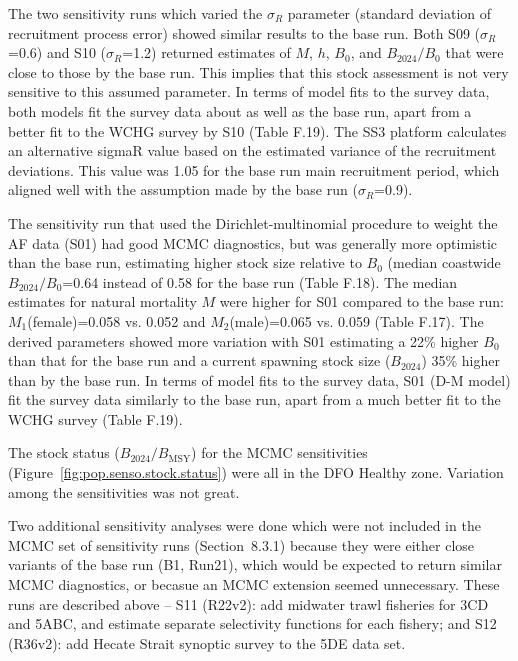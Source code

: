 \documentclass[11pt]{book}
\newcommand{\Bmsy}{B_\text{MSY}}
\newcommand{\Bcurr}{B_{2024}}
\newcommand{\pc}{\%}
\begin{document}
The two sensitivity runs which varied the $\sigma_R$ parameter (standard deviation of recruitment process error) showed similar results to the base run. 
Both S09 ($\sigma_R$=0.6) and S10 ($\sigma_R$=1.2) returned estimates of $M$, $h$, $B_0$, and $\Bcurr/B_0$ that were close to those by the base run. 
This implies that this stock assessment is not very sensitive to this assumed parameter.
In terms of model fits to the survey data, both models fit the survey data about as well as the base run, apart from a better fit to the WCHG survey by S10 (Table F.19).
The SS3 platform calculates an alternative sigmaR value based on the estimated variance of the recruitment deviations.
This value was 1.05 for the base run main recruitment period, which aligned well with the assumption made by the base run ($\sigma_R$=0.9).

The sensitivity run that used the Dirichlet-multinomial procedure to weight the AF data (S01) had good MCMC diagnostics, but was generally more optimistic than the base run, estimating higher stock size relative to $B_0$ (median coastwide $\Bcurr/B_0$=0.64 instead of 0.58 for the base run (Table F.18).
The median estimates for natural mortality $M$ were higher for S01 compared to the base run: $M_1$(female)=0.058 vs. 0.052 and $M_2$(male)=0.065 vs. 0.059 (Table F.17). 
The derived parameters showed more variation with S01 estimating a 22\pc{} higher $B_0$ than that for the base run and a current spawning stock size ($\Bcurr$) 35\pc{} higher than by the base run. 
In terms of model fits to the survey data, S01 (D-M model) fit the survey data similarly to the base run, apart from a much better fit to the WCHG survey (Table F.19).

The stock status ($\Bcurr/\Bmsy$) for the MCMC sensitivities (Figure~\ref{fig:pop.senso.stock.status}) were all in the DFO Healthy zone.
Variation among the sensitivities was not great.

Two additional sensitivity analyses were done which were not included in the MCMC set of sensitivity runs (Section~8.3.1) because they were either close variants of the base run (B1, Run21), which would be expected to return similar MCMC diagnostics, or becasue an MCMC extension seemed unnecessary.
These runs are described above -- S11 (R22v2): add midwater trawl fisheries for 3CD and 5ABC, and estimate separate selectivity functions for each fishery; and S12 (R36v2): add Hecate Strait synoptic survey to the 5DE data set.
\end{document}
